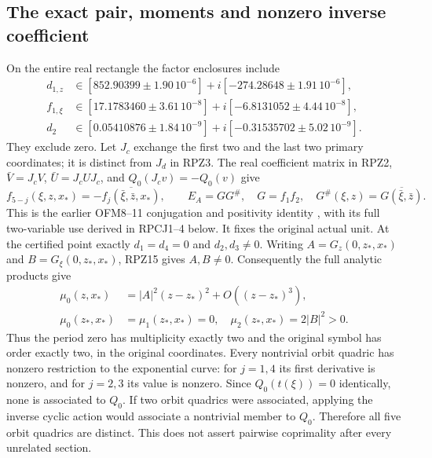 \subsection{The exact pair, moments and nonzero inverse coefficient}
On the entire real rectangle the factor enclosures include
\[
 \begin{aligned}
 d_{1,z}&\in[852.90399\pm1.90\,10^{-6}]
                   +i[-274.28648\pm1.91\,10^{-6}],\\
 f_{1,\xi}&\in[17.1783460\pm3.61\,10^{-8}]
                   +i[-6.8131052\pm4.44\,10^{-8}],\\
 d_2&\in[0.05410876\pm1.84\,10^{-9}]
                   +i[-0.31535702\pm5.02\,10^{-9}].
 \end{aligned}\tag{RPZ15}
\]
They exclude zero. Let $J_c$ exchange the first two and the last
two primary coordinates; it is distinct from $J_d$ in RPZ3.
The real coefficient matrix in RPZ2, $\bar V=J_cV$,
$\bar U=J_cUJ_c$, and $Q_0(J_cv)=-Q_0(v)$ give
\[
 f_{5-j}(\xi,z,x_*)=-\overline{f_j(\bar\xi,\bar z,x_*)},\qquad
 E_A=G G^\#,\quad G=f_1f_2,\quad
 G^\#(\xi,z)=\overline{G(\bar\xi,\bar z)}.\tag{RPZ16}
\]
This is the earlier OFM8--11 conjugation and positivity identity
\cite{PCLOriginal,Cumulative}, with its full two-variable use
derived in RPCJ1--4 below. It fixes the original actual unit.
At the certified point exactly $d_1=d_4=0$ and $d_2,d_3\ne0$.
Writing $A=G_z(0,z_*,x_*)$ and $B=G_\xi(0,z_*,x_*)$, RPZ15
gives $A,B\ne0$. Consequently the full analytic products give
\[
 \begin{aligned}
 \mu_0(z,x_*)&=|A|^2(z-z_*)^2+O((z-z_*)^3),\\
 \mu_0(z_*,x_*)&=\mu_1(z_*,x_*)=0,\quad
 \mu_2(z_*,x_*)=2|B|^2>0 .
 \end{aligned}\tag{RPZ17}
\]
Thus the period zero has multiplicity exactly two and the original
symbol has order exactly two, in the original coordinates.
Every nontrivial orbit quadric has nonzero restriction to the
exponential curve: for $j=1,4$ its first derivative is nonzero,
and for $j=2,3$ its value is nonzero. Since $Q_0(t(\xi))=0$
identically, none is associated to $Q_0$. If two orbit quadrics
were associated, applying the inverse cyclic action would associate
a nontrivial member to $Q_0$. Therefore all five orbit quadrics
are distinct. This does not assert pairwise coprimality after every
unrelated section.

